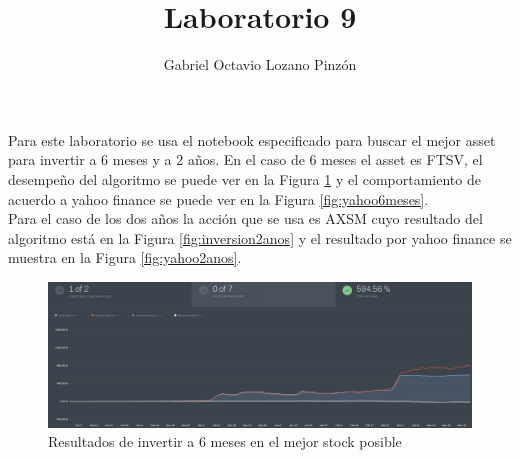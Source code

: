 \documentclass[12pt,a4paper]{article}
\author{Gabriel Octavio Lozano Pinzón}
\title{Laboratorio 9}
\begin{document}
\maketitle
Para este laboratorio se usa el notebook especificado para buscar el mejor asset para invertir a 6 meses y a 2 años. En el caso de 6 meses el asset es FTSV, el desempeño del algoritmo se puede ver en la Figura \ref{fig:inversion6meses} y el comportamiento de acuerdo a yahoo finance se puede ver en la Figura \ref{fig:yahoo6meses}.  \\

Para el caso de los dos años la acción que se usa es AXSM cuyo resultado del algoritmo está en la Figura \ref{fig:inversion2anos} y el resultado por yahoo finance se muestra en la Figura \ref{fig:yahoo2anos}.



\begin{figure}
	\centering
	\includegraphics[width=1\linewidth]{inversion_6_meses}
	\caption{Resultados de invertir a 6 meses en el mejor stock posible}
	\label{fig:inversion6meses}
\end{figure}
\end{document}
